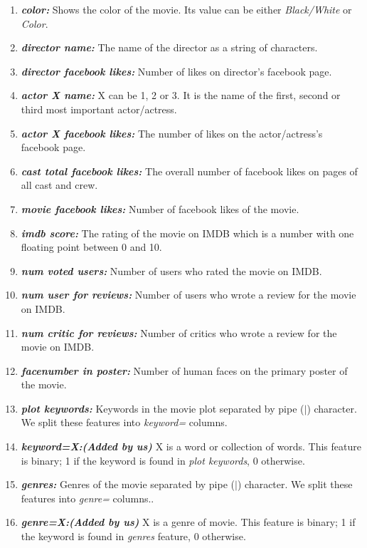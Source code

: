 \documentclass[journal,transmag]{IEEEtran}
\begin{document}
\begin{enumerate}
\item{\textbf{\textit{color:}}} Shows the color of the movie. Its value can be either \textit{Black/White} or \textit{Color}.

\item{\textbf{\textit{director name:}}} The name of the director as a string of characters.
\item{\textbf{\textit{director facebook likes:}}} Number of likes on director's facebook page.
\item{\textbf{\textit{actor X name:}}} X can be 1, 2 or 3. It is the name of the first, second or third most important actor/actress. 
\item{\textbf{\textit{actor X facebook likes:}}} The number of likes on the actor/actress's facebook page.
\item{\textbf{\textit{cast total facebook likes:}}} The overall number of facebook likes on pages of all cast and crew.
\item{\textbf{\textit{movie facebook likes:}}} Number of facebook likes of the movie. 
\item{\textbf{\textit{imdb score:}}} The rating of the movie on IMDB which is a number with one floating point between 0 and 10.
\item{\textbf{\textit{num voted users:}}} Number of users who rated the movie on IMDB.
\item{\textbf{\textit{num user for reviews:}}} Number of users who wrote a review for the movie on IMDB.
\item{\textbf{\textit{num critic for reviews:}}} Number of critics who wrote a review for the movie on IMDB.
\item{\textbf{\textit{facenumber in poster:}}} Number of human faces on the primary poster of the movie.
\item{\textbf{\textit{plot keywords:}}} Keywords in the movie plot separated by pipe ($|$) character. We split these features into \textit{keyword=} columns.
\item{\textbf{\textit{keyword=X:(Added by us)}}} X is a word or collection of words. This feature is binary; 1 if the keyword is found in \textit{plot keywords}, 0 otherwise.
\item{\textbf{\textit{genres:}}} Genres of the movie separated by pipe ($|$) character. We split these features into \textit{genre=} columns..
\item{\textbf{\textit{genre=X:(Added by us)}}} X is a genre of movie. This feature is binary; 1 if the keyword is found in \textit{genres} feature, 0 otherwise.

\end{enumerate}
\end{document}
